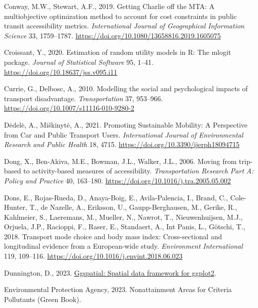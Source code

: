 \documentclass[
  letterpaper,
  DIV=11,
  numbers=noendperiod]{scrreport}
\newlength{\cslhangindent}
\newlength{\cslentryspacingunit} %
\newenvironment{CSLReferences}[2] %
 {%
  \setlength{\parindent}{0pt}
  \ifodd #1
  \let\oldpar\par
  \def\par{\hangindent=\cslhangindent\oldpar}
  \fi
  \setlength{\parskip}{#2\cslentryspacingunit}
 }%
 {}
\begin{document}
\begin{CSLReferences}{1}{0}
\leavevmode{}%
Conway, M.W., Stewart, A.F., 2019. Getting {Charlie} off the {MTA}: A
multiobjective optimization method to account for cost constraints in
public transit accessibility metrics. \emph{International Journal of
Geographical Information Science} 33, 1759--1787.
\url{https://doi.org/10.1080/13658816.2019.1605075}

\leavevmode{}%
Croissant, Y., 2020. Estimation of random utility models in {R}: The
{mlogit} package. \emph{Journal of Statistical Software} 95, 1--41.
\url{https://doi.org/10.18637/jss.v095.i11}

\leavevmode{}%
Currie, G., Delbosc, A., 2010. Modelling the social and psychological
impacts of transport disadvantage. \emph{Transportation} 37, 953--966.
\url{https://doi.org/10.1007/s11116-010-9280-2}

\leavevmode{}%
Dėdelė, A., Miškinytė, A., 2021. Promoting {Sustainable Mobility}: {A
Perspective} from {Car} and {Public Transport Users}.
\emph{International Journal of Environmental Research and Public Health}
18, 4715. \url{https://doi.org/10.3390/ijerph18094715}

\leavevmode{}%
Dong, X., Ben-Akiva, M.E., Bowman, J.L., Walker, J.L., 2006. Moving from
trip-based to activity-based measures of accessibility.
\emph{Transportation Research Part A: Policy and Practice} 40, 163--180.
\url{https://doi.org/10.1016/j.tra.2005.05.002}

\leavevmode{}%
Dons, E., Rojas-Rueda, D., Anaya-Boig, E., Avila-Palencia, I., Brand,
C., Cole-Hunter, T., de Nazelle, A., Eriksson, U., Gaupp-Berghausen, M.,
Gerike, R., Kahlmeier, S., Laeremans, M., Mueller, N., Nawrot, T.,
Nieuwenhuijsen, M.J., Orjuela, J.P., Racioppi, F., Raser, E., Standaert,
A., Int Panis, L., Götschi, T., 2018. Transport mode choice and body
mass index: {Cross-sectional} and longitudinal evidence from a
{European-wide} study. \emph{Environment International} 119, 109--116.
\url{https://doi.org/10.1016/j.envint.2018.06.023}

\leavevmode{}%
Dunnington, D., 2023.
\href{https://CRAN.R-project.org/package=ggspatial}{Ggspatial: Spatial
data framework for ggplot2}.

\leavevmode{}%
Environmental Protection Agency, 2023. Nonattainment {Areas} for
{Criteria Pollutants} ({Green Book}).


\end{CSLReferences}
\end{document}
